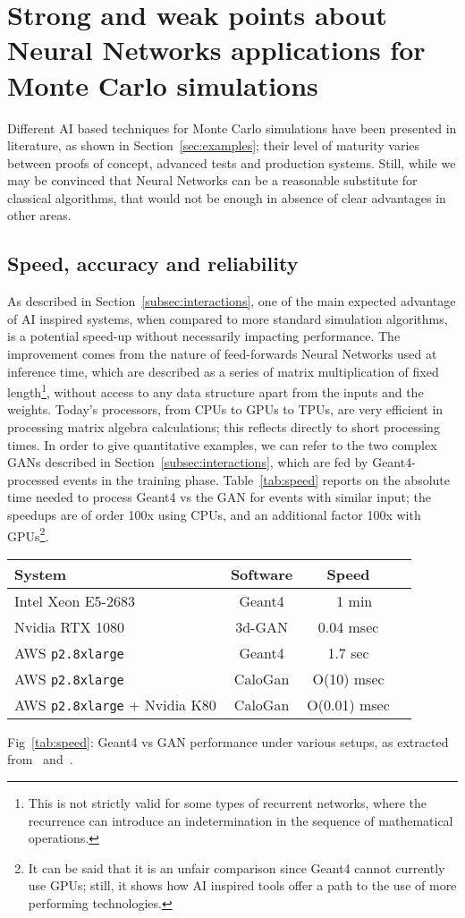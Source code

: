 \section{Strong and weak points about Neural Networks applications for Monte Carlo simulations}
Different AI based techniques for Monte Carlo simulations have been presented in literature, as shown in Section~\ref{sec:examples}; their level of maturity varies between proofs of concept, advanced tests and production systems. Still, while we may be convinced that Neural Networks can be a reasonable substitute for classical algorithms, that would not be enough in absence of clear advantages in other areas.

\subsection{Speed, accuracy and reliability}
\label{subsec:speed}
As described in Section~\ref{subsec:interactions}, one of the main expected advantage of AI inspired systems, when compared to more standard simulation algorithms, is a potential speed-up without necessarily impacting performance.
The improvement comes from the nature of feed-forwards Neural Networks used at inference time, which are described as a series of matrix multiplication of fixed length\footnote{This is not strictly valid for some types of recurrent networks, where the recurrence can introduce an indetermination in the sequence of mathematical operations.}, without access to any data structure apart from the inputs and the weights. Today's processors, from CPUs to GPUs to TPUs, are very efficient in processing matrix algebra calculations; this reflects directly to short processing times.
In order to give quantitative examples, we can refer to the two complex GANs described in Section~\ref{subsec:interactions}, which are fed by Geant4-processed events in the training phase.
Table~\ref{tab:speed} reports on the absolute time needed to process Geant4 vs the GAN for events with similar input; the speedups are of order 100x using CPUs, and an additional factor 100x with GPUs\footnote{It can be said that it is an unfair comparison since Geant4 cannot currently use GPUs; still, it shows how AI inspired tools offer a path to the use of more performing technologies.}.
\begin{center}
\begin{tabular}{l|c|c|c}
    System & Software & Speed \\
    \hline
     Intel Xeon E5-2683 & Geant4 & ~ 1 min \\
     Nvidia RTX 1080 & 3d-GAN & 0.04 msec\\
          \hline
     AWS \verb!p2.8xlarge!  & Geant4 & 1.7 sec \\
     AWS \verb!p2.8xlarge!  & CaloGan & O(10) msec \\
     AWS \verb!p2.8xlarge!  + Nvidia K80 & CaloGan & O(0.01) msec
\end{tabular}
Fig~\ref{tab:speed}: Geant4 vs GAN performance under various setups, as extracted from~\cite{Paganini2018} and~\cite{Carminati2018}.
\label{tab:speed}
\end{center}
